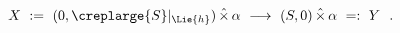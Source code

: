 \begin{equation}\label{bcflow}
X\ :=\ (0, \creplarge{S}|_{\Lie{h}}) \, \hat{\times }\,  \alpha \ \longrightarrow \ 
(S,0)\, \hat{\times }\,  \alpha  \ =:\ Y\ \ .
\end{equation}

